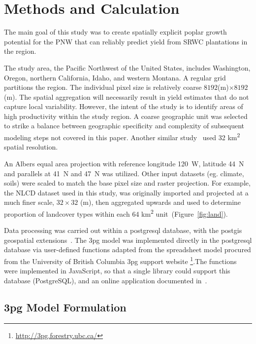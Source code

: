 \documentclass[preprint,review,12pt]{elsarticle}
\begin{document}
\section{Methods and Calculation}

The main goal of this study was to create spatially explicit poplar
growth potential for the \ac{PNW} that can reliably predict yield
from \ac{SRWC} plantations in the region.

The study area, the Pacific Northwest of the United States, includes
Washington, Oregon, northern California, Idaho, and western Montana.
A regular grid partitions the region.  The individual pixel size is
relatively coarse $8192$(m)$ \times 8192$(m). The spatial aggregation
will necessarily result in yield estimates that do not capture local
variability. However, the intent of the study is to identify areas of
high productivity within the study region. A coarse geographic unit
was selected to strike a balance between geographic specificity and
complexity of subsequent modeling steps not covered in this
paper. Another similar study~\cite{Headlee2012} used 32
km\textsuperscript{2} spatial resolution.

An Albers equal area projection with reference longitude 120\degree~W,
latitude 44\degree~N and parallels at 41\degree~N and 47\degree~N was
utilized.
Other input datasets (eg. climate, soils) were scaled to match the base
pixel size and raster projection. For example, the \ac{NLCD} dataset
used in this study, was originally imported and projected at a much
finer scale, $32 \times 32$ (m), then aggregated upwards and used to determine
proportion of landcover types within each 64 km\textsuperscript{2} unit~(Figure~\ref{fig:land}).

Data processing was carried out within a postgresql database, with the
postgis geospatial extensions~\cite{pgsql,Holl2009,postgis}.  The
\ac{3pg} model was implemented directly in the postgresql database via
user-defined functions adapted from the spreadsheet model procured
from the University of British Columbia \ac{3pg} support website
\footnote{\href{http://3pg.forestry.ubc.ca/}{http://3pg.forestry.ubc.ca/}}.The functions were implemented in JavaScript\texttrademark, so that a single library
could support this database (PostgreSQL), and an online application
documented in~\cite{Prilepova2014}.

\subsection{\acs{3pg} Model Formulation}
\label{sec:3pg}
\end{document}
